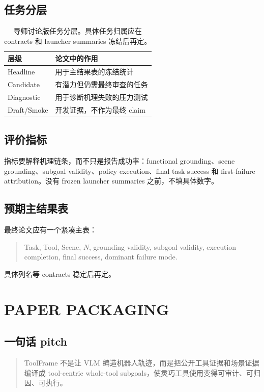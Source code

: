 \documentclass[letterpaper, 10 pt, conference]{ieeeconf}
\newcommand{\method}{ToolFrame}
\begin{document}
\subsection{任务分层}
\begin{table}[t]
\caption{导师讨论版任务分层。具体任务归属应在 contracts 和 launcher summaries 冻结后再定。}
\label{tab:tiers}
\begin{center}
\begin{tabular}{ll}
\toprule
层级 & 论文中的作用 \\
\midrule
Headline & 用于主结果表的冻结统计 \\
Candidate & 有潜力但仍需最终审查的任务 \\
Diagnostic & 用于诊断机理失败的压力测试 \\
Draft/Smoke & 开发证据，不作为最终 claim \\
\bottomrule
\end{tabular}
\end{center}
\end{table}

\subsection{评价指标}
指标要解释机理链条，而不只是报告成功率：functional grounding、scene grounding、subgoal validity、policy execution、final task success 和 first-failure attribution。没有 frozen launcher summaries 之前，不填具体数字。

\subsection{预期主结果表}
最终论文应有一个紧凑主表：
\begin{quote}
Task, Tool, Scene, $N$, grounding validity, subgoal validity, execution
completion, final success, dominant failure mode.
\end{quote}
具体列名等 contracts 稳定后再定。

\section{PAPER PACKAGING}

\subsection{一句话 pitch}
\begin{quote}
\method{} 不是让 VLM 编造机器人轨迹，而是把公开工具证据和场景证据编译成 tool-centric whole-tool subgoals，使灵巧工具使用变得可审计、可归因、可执行。
\end{quote}
\end{document}
